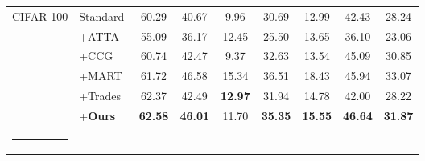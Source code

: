 \documentclass[10pt,twocolumn,letterpaper]{article}
\makeatletter
\def\hlinew#1{%
  \noalign{\ifnum0=`}\fi\hrule \@height #1 \futurelet
   \reserved@a\@xhline}
\makeatother
\begin{document}
\begin{table*}[!t]
\begin{tabular}{llccccccc}
        \multirow{5}{*}{CIFAR-100} 
        & Standard & 60.29 &40.67          & 9.96      & 30.69      & 12.99       & 42.43          & 28.24  \\
        & +ATTA~\cite{zheng2020efficient} & 55.09 &36.17          & 12.45     & 25.50      & 13.65       & 36.10          & 23.06  \\
        & +CCG\cite{tack2021consistency}   & 60.74  &42.47          & 9.37      & 32.63      & 13.54       & 45.09          & 30.85  \\ 
        & +MART~\cite{Wang2020Improving}  & 61.72   &46.58          & 15.34     & 36.51      & 18.43       & 45.94          & 33.07  \\ 
        & +Trades~\cite{Zhang2019tradeoff} & 62.37 &42.49          & \textbf{12.97}     & 31.94      & 14.78       & 42.00          & 28.22  \\ 
        & +\textbf{Ours} &\textbf{62.58} &\textbf{46.01}          & 11.70     & \textbf{35.35}      & \textbf{15.55}       & \textbf{46.64}          & \textbf{31.87} \\ \hlinew{1pt} 
        \end{tabular}
    \end{table*}
\fi

\iffalse
\end{document}
